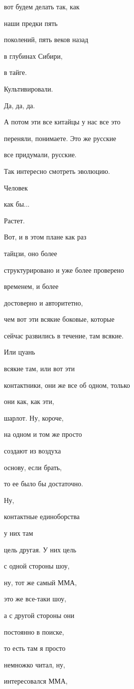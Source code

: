 вот будем делать так, как

наши предки пять

поколений, пять веков назад

в глубинах Сибири,

в тайге.

Культивировали.

Да, да, да.

А потом эти все китайцы у нас все это

переняли, понимаете. Это же русские

все придумали, русские.

Так интересно смотреть эволюцию.

Человек

как бы...

Растет.

Вот, и в этом плане как раз

тайцзи, оно более

структурировано и уже более проверено

временем, и более

достоверно и авторитетно,

чем вот эти всякие боковые, которые

сейчас развились в течение, там всякие.

Или цуань

всякие там, или вот эти

контактники, они же все об одном, только

они как, как эти,

шарлот. Ну, короче,

на одном и том же просто

создают из воздуха

основу, если брать,

то ее было бы достаточно.

Ну,

контактные единоборства

у них там

цель другая. У них цель

с одной стороны шоу,

ну, тот же самый ММА,

это же все-таки шоу,

а с другой стороны они

постоянно в поиске,

то есть там я просто

немножко читал, ну,

интересовался ММА,

